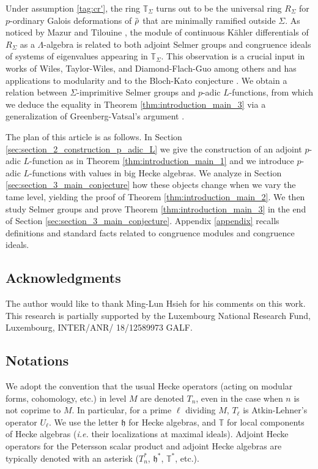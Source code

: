 \documentclass[12pt]{amsart}
\newcommand\bT{\mathbb{T}}
\newcommand\gh{\mathfrak{h}}
\newcommand{\ob}[1]{\mkern 1.5mu\overline{\mkern-1.5mu#1\mkern-1.5mu}\mkern 1.5mu}
\theoremstyle{defstyle}
\theoremstyle{thmstyle}
\begin{document}
Under assumption \eqref{tag:cr'}, the ring $\bT_\Sigma$ turns out to be the universal ring $R_\Sigma$ for $p$-ordinary Galois deformations of $\ob{\rho}$ that are minimally ramified outside $\Sigma$. 
As noticed by Mazur and Tilouine \cite{mazurtilouine}, the module of continuous Kähler differentials of $R_\Sigma$ as a $\Lambda$-algebra is related to both adjoint Selmer groups and congruence ideals of systems of eigenvalues appearing in $\bT_\Sigma$. 
This observation is a crucial input in works of Wiles, Taylor-Wiles, and Diamond-Flach-Guo among others and has applications to modularity and to the Bloch-Kato conjecture \cite{wilesfermat,taylorwiles,DFG}. 
We obtain a relation between $\Sigma$-imprimitive Selmer groups and $p$-adic $L$-functions, from which we deduce the equality in Theorem \ref{thm:introduction_main_3} via a generalization of Greenberg-Vatsal's argument \cite{greenbergvatsal2000}.

The plan of this article is as follows. In Section \ref{sec:section_2_construction_p_adic_L} we give the construction of an adjoint $p$-adic $L$-function as in Theorem \ref{thm:introduction_main_1} and we introduce $p$-adic $L$-functions with values in big Hecke algebras. We analyze in Section \ref{sec:section_3_main_conjecture} how these objects change when we vary the tame level, yielding the proof of Theorem \ref{thm:introduction_main_2}. We then study Selmer groups and prove Theorem \ref{thm:introduction_main_3} in the end of Section \ref{sec:section_3_main_conjecture}. Appendix \ref{appendix} recalls definitions and standard facts related to congruence modules and congruence ideals.

\subsection*{Acknowledgments}
The author would like to thank Ming-Lun Hsieh for his comments on this work. This research is partially supported by the Luxembourg National Research Fund, Luxembourg, INTER/ANR/ 18/12589973 GALF.

\subsection*{Notations}
We adopt the convention that the usual Hecke operators (acting on modular forms, cohomology, etc.) in level $M$ are denoted $T_n$, even in the case when $n$ is not coprime to $M$. In particular, for a prime $\ell$ dividing $M$, $T_\ell$ is Atkin-Lehner's operator $U_\ell$. We use the letter $\gh$ for Hecke algebras, and $\bT$ for local components of Hecke algebras (\textit{i.e.} their localizations at maximal ideals). Adjoint Hecke operators for the Petersson scalar product and adjoint Hecke algebras are typically denoted with an asterisk ($T_n^*$, $\gh^*$, $\bT^*$, etc.).
\end{document}
